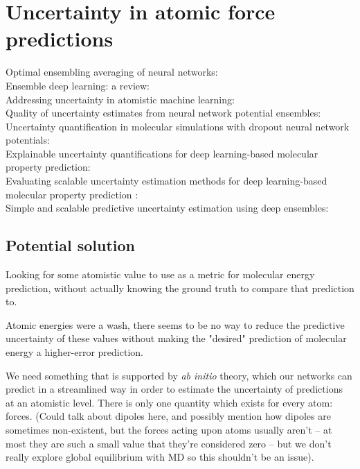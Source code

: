 \chapter{Uncertainty in atomic force predictions}
\label{chapter3}



Optimal ensembling averaging of neural networks: \cite{optimal_ensemble_averaging_naftaly}\\
Ensemble deep learning: a review: \cite{ensemble_deep_learning_review_ganaie}\\
Addressing uncertainty in atomistic machine learning: \cite{uncertainty_atomistic_ml_peterson}\\
Quality of uncertainty estimates from neural network potential ensembles: \cite{uncertainty_of_nnp_ensembles_kahle}\\
Uncertainty quantification in molecular simulations with dropout neural network potentials: \cite{uncertainty_quantification_dropout_wen}\\
Explainable uncertainty quantifications for deep learning-based molecular property prediction: \cite{uncertainty_quantification_yang}\\
Evaluating scalable uncertainty estimation methods for deep learning-based molecular property prediction : \cite{scalable_uncertainty_scalia}\\
Simple and scalable predictive uncertainty estimation using deep ensembles: \cite{scalable_uncertainty_lakshminarayanan}\\



\section{Potential solution}
\label{sec:uncertainty_potential_solution}
Looking for some atomistic value to use as a metric for molecular energy prediction, without actually knowing the ground truth to compare that prediction to. 

Atomic energies were a wash, there seems to be no way to reduce the predictive uncertainty of these values without making the "desired" prediction of molecular energy a higher-error prediction. 

We need something that is supported by \textit{ab initio} theory, which our networks can predict in a streamlined way in order to estimate the uncertainty of predictions at an atomistic level. There is only one quantity which exists for every atom: forces. (Could talk about dipoles here, and possibly mention how dipoles are sometimes non-existent, but the forces acting upon atoms usually aren't -- at most they are such a small value that they're considered zero -- but we don't really explore global equilibrium with MD so this shouldn't be an issue).

